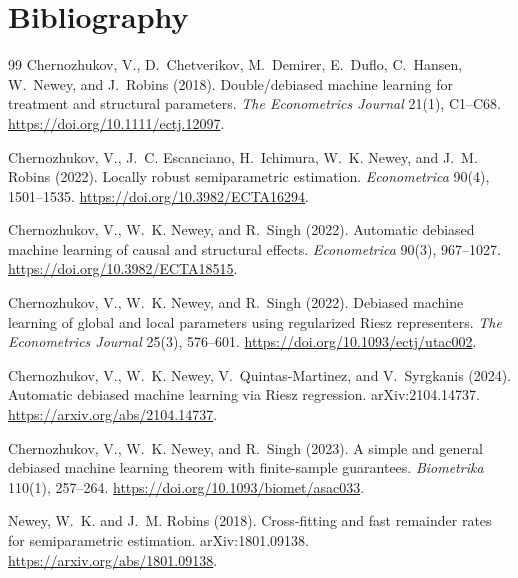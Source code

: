\documentclass[11pt]{article}
\theoremstyle{definition}
\theoremstyle{plain}
\theoremstyle{remark}
\begin{document}
\section*{Bibliography}
\begin{thebibliography}{99}
Chernozhukov, V., D.~Chetverikov, M.~Demirer, E.~Duflo, C.~Hansen,
W.~Newey, and J.~Robins (2018).
\newblock Double/debiased machine learning for treatment and structural
parameters.
\newblock \emph{The Econometrics Journal} 21(1), C1--C68.
\newblock \url{https://doi.org/10.1111/ectj.12097}.

Chernozhukov, V., J.~C. Escanciano, H.~Ichimura, W.~K. Newey, and J.~M. Robins
(2022).
\newblock Locally robust semiparametric estimation.
\newblock \emph{Econometrica} 90(4), 1501--1535.
\newblock \url{https://doi.org/10.3982/ECTA16294}.

Chernozhukov, V., W.~K. Newey, and R.~Singh (2022).
\newblock Automatic debiased machine learning of causal and structural effects.
\newblock \emph{Econometrica} 90(3), 967--1027.
\newblock \url{https://doi.org/10.3982/ECTA18515}.

Chernozhukov, V., W.~K. Newey, and R.~Singh (2022).
\newblock Debiased machine learning of global and local parameters using
regularized Riesz representers.
\newblock \emph{The Econometrics Journal} 25(3), 576--601.
\newblock \url{https://doi.org/10.1093/ectj/utac002}.

Chernozhukov, V., W.~K. Newey, V.~Quintas-Martinez, and V.~Syrgkanis (2024).
\newblock Automatic debiased machine learning via Riesz regression.
\newblock arXiv:2104.14737.
\newblock \url{https://arxiv.org/abs/2104.14737}.

Chernozhukov, V., W.~K. Newey, and R.~Singh (2023).
\newblock A simple and general debiased machine learning theorem with
finite-sample guarantees.
\newblock \emph{Biometrika} 110(1), 257--264.
\newblock \url{https://doi.org/10.1093/biomet/asac033}.

Newey, W.~K. and J.~M. Robins (2018).
\newblock Cross-fitting and fast remainder rates for semiparametric estimation.
\newblock arXiv:1801.09138.
\newblock \url{https://arxiv.org/abs/1801.09138}.


\end{thebibliography}
\end{document}
